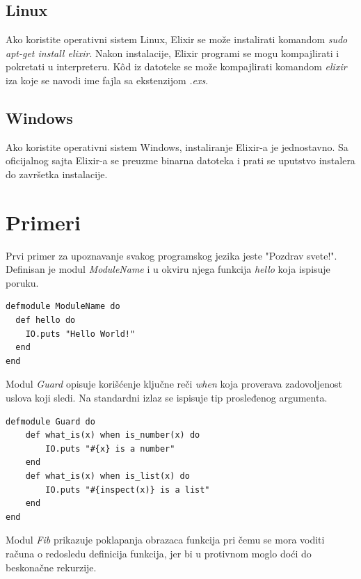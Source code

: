 \documentclass[a4paper]{article}
\begin{document}
\subsection{Linux}    
Ako koristite operativni sistem Linux, Elixir se može instalirati komandom {\em sudo apt-get install elixir}\cite{siteElixir}. Nakon instalacije, Elixir programi se mogu kompajlirati i pokretati u interpreteru. Kôd iz datoteke se može kompajlirati komandom {\em elixir} iza koje se navodi ime fajla sa ekstenzijom {\em .exs}.

\subsection{Windows}    
Ako koristite operativni sistem Windows, instaliranje Elixir-a je jednostavno. Sa oficijalnog sajta Elixir-a \cite{siteElixir} se preuzme binarna datoteka i prati se uputstvo instalera do završetka instalacije. 
 
\section{Primeri}
Prvi primer za upoznavanje svakog programskog jezika jeste "Pozdrav svete!". Definisan je modul {\em ModuleName} i u okviru njega funkcija {\em hello} koja ispisuje poruku.

\begin{lstlisting}[caption={Ispis poruke "Hello World!"},frame=none, label=simple]
defmodule ModuleName do
  def hello do
    IO.puts "Hello World!"
  end
end
\end{lstlisting}

Modul {\em Guard} opisuje korišćenje ključne reči {\em when} koja proverava zadovoljenost uslova koji sledi. Na standardni izlaz se ispisuje tip prosleđenog argumenta.
\begin{lstlisting}[caption={Provera da li je argument broj ili lista},frame=none, label=simple]
defmodule Guard do
    def what_is(x) when is_number(x) do
        IO.puts "#{x} is a number"
    end
    def what_is(x) when is_list(x) do
        IO.puts "#{inspect(x)} is a list"
    end
end
\end{lstlisting}

%
Modul {\em Fib} prikazuje poklapanja obrazaca funkcija pri čemu se mora voditi računa o redosledu definicija funkcija, jer bi u protivnom moglo doći do beskonačne rekurzije.
\newpage
\end{document}
